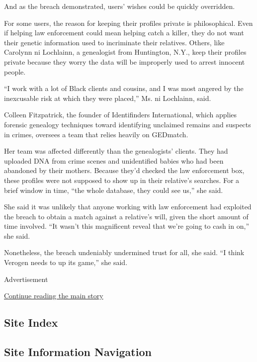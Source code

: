 And as the breach demonstrated, users' wishes could be quickly
overridden.

For some users, the reason for keeping their profiles private is
philosophical. Even if helping law enforcement could mean helping catch
a killer, they do not want their genetic information used to incriminate
their relatives. Others, like Carolynn ni Lochlainn, a genealogist from
Huntington, N.Y., keep their profiles private because they worry the
data will be improperly used to arrest innocent people.

``I work with a lot of Black clients and cousins, and I was most angered
by the inexcusable risk at which they were placed,'' Ms. ni Lochlainn,
said.

Colleen Fitzpatrick, the founder of Identifinders International, which
applies forensic genealogy techniques toward identifying unclaimed
remains and suspects in crimes, oversees a team that relies heavily on
GEDmatch.

Her team was affected differently than the genealogists' clients. They
had uploaded DNA from crime scenes and unidentified babies who had been
abandoned by their mothers. Because they'd checked the law enforcement
box, these profiles were not supposed to show up in their relative's
searches. For a brief window in time, ``the whole database, they could
see us,'' she said.

She said it was unlikely that anyone working with law enforcement had
exploited the breach to obtain a match against a relative's will, given
the short amount of time involved. ``It wasn't this magnificent reveal
that we're going to cash in on,'' she said.

Nonetheless, the breach undeniably undermined trust for all, she said.
``I think Verogen needs to up its game,'' she said.

Advertisement

\protect\hyperlink{after-bottom}{Continue reading the main story}

\hypertarget{site-index}{%
\subsection{Site Index}\label{site-index}}

\hypertarget{site-information-navigation}{%
\subsection{Site Information
Navigation}\label{site-information-navigation}}

